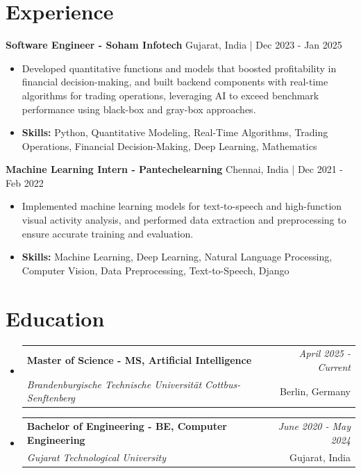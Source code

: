 \documentclass[a4paper,11pt]{article}
\makeatletter
\newcommand{\resumeSubheading}[4]{
\vspace{0.5mm}\item
    \begin{tabular*}{\linewidth}[t]{l@{\extracolsep{\fill}}r}
        \textbf{#1} & \textit{\footnotesize{#4}} \\
        \textit{\footnotesize{#3}} &  \footnotesize{#2}\\
    \end{tabular*}
    \vspace{-2.4mm}
}
\makeatother
\begin{document}
\section{\textbf{Experience}}


\vspace{1mm}
  \textbf{Software Engineer - Soham Infotech} \hfill Gujarat, India | Dec 2023 - Jan 2025
\vspace{-1.5mm} %
\begin{itemize}
  \item Developed quantitative functions and models that boosted profitability in financial decision-making, and built backend components with real-time algorithms for trading operations, leveraging AI to exceed benchmark performance using black-box and gray-box approaches.

\vspace{-2mm}
  \item \textbf{Skills:} Python, Quantitative Modeling, Real-Time Algorithms, Trading Operations, Financial Decision-Making, Deep Learning, Mathematics
\end{itemize}

\vspace{1mm}
  \textbf{Machine Learning Intern - Pantechelearning} \hfill Chennai, India | Dec 2021 - Feb 2022
\vspace{-1.5mm} %
\begin{itemize}
  \item Implemented machine learning models for text-to-speech and high-function visual activity analysis, and performed data extraction and preprocessing to ensure accurate training and evaluation.
\vspace{-2mm}
  \item \textbf{Skills:} Machine Learning, Deep Learning, Natural Language Processing, Computer Vision, Data Preprocessing, Text-to-Speech, Django
\end{itemize}\section{\textbf{Education}}
\vspace{-0.4mm}

\begin{itemize}[leftmargin=0.15in, label={}]
\resumeSubheading
{Master of Science - MS, Artificial Intelligence }{Berlin, Germany}
{Brandenburgische Technische Universität Cottbus-Senftenberg  }{April 2025 - Current}

\vspace{1.0mm} %
\resumeSubheading
{Bachelor of Engineering - BE, Computer Engineering  }{Gujarat, India}
{Gujarat Technological University }{June 2020 - May 2024}

\end{itemize}
\end{document}
